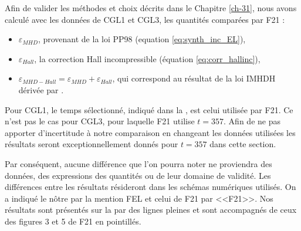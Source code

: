 Afin de valider les méthodes et choix décrits dans le Chapitre \ref{ch-31}, nous avons calculé avec les données de CGL1 et CGL3, les quantités comparées par \ac{F21} : 
\begin{itemize}
    \item $\varepsilon_{MHD}$, provenant de la loi \acs{PP98} (equation \eqref{eq:synth_inc_EL}),
    \item $\varepsilon_{Hall}$, la correction Hall incompressible (équation \eqref{eq:corr_hallinc}),
    \item $\varepsilon_{MHD-Hall} = \varepsilon_{MHD} + \varepsilon_{Hall}$, qui correspond au résultat de la loi \acs{IMHDH} dérivée par \cite{ferrand_exact_2019}.
\end{itemize} 
Pour CGL1, le temps sélectionné, indiqué dans la , est celui utilisée par \ac{F21}. Ce n'est pas le cas pour CGL3, pour laquelle \ac{F21} utilise $t =\num{357}$. Afin de ne pas apporter d'incertitude à notre comparaison en changeant les données utilisées les résultats seront exceptionnellement donnés pour $t =\num{357}$ dans cette section. 

Par conséquent, aucune différence que l'on pourra noter ne proviendra des données, des expressions des quantités ou de leur domaine de validité. Les différences entre les résultats résideront dans les schémas numériques utilisés. On a indiqué le nôtre par la mention \ac{FEL} et celui de \ac{F21} par <<F21>>.  Nos résultats sont présentés sur la  par des lignes pleines et sont accompagnés de ceux des figures 3 et 5 de \ac{F21} en pointillés. 

